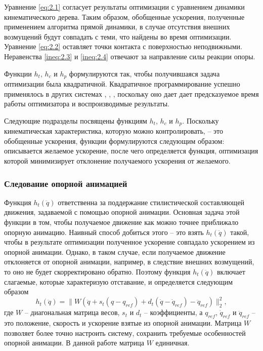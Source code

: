 Уравнение \ref{eq:2.1} согласует результаты оптимизации с уравнением динамики кинематического дерева. Таким образом, обобщенные ускорения, полученные применением алгоритма прямой динамики, в случае отсутствия внешних возмущений будут совпадать с теми, что найдены во время оптимизации. Уравнение \ref{eq:2.2} оставляет точки контакта с поверхностью неподвижными. Неравенства \ref{ineq:2.3} и \ref{ineq:2.4} отвечают за направление силы реакции опоры.

Функции $h_{t}$, $h_{c}$ и $h_{p}$ формулируются так, чтобы получившаяся задача оптимизации была квадратичной. Квадратичное программирование успешно применялось в других системах \cite{AbeSP}, \cite{MacchiettoZS}, \cite{SilvaAP}, поскольку оно дает дает предсказуемое время работы оптимизатора и воспроизводимые результаты.

Следующие подразделы посвящены функциям $h_{t}$, $h_{c}$ и $h_{p}$. Поскольку кинематическая характеристика, которую можно контролировать, -- это обобщенные ускорения, функции формулируются следующим образом: описывается желаемое ускорение, после чего определяется функция, оптимизация которой минимизирует отклонение получаемого ускорения от желаемого.

\subsubsection{Следование опорной анимацией}

Функция $h_{t}(\ddot{q})$ ответственна за поддержание стилистической составляющей движения, задаваемой с помощью опорной анимации. Основная задача этой функции в том, чтобы получаемое движение как можно точнее приближало опорную анимацию. Наивный способ добиться этого -- это взять $h_{t}(\ddot{q})$ такой, чтобы в результате оптимизации полученное ускорение совпадало ускорением из опорной анимации. Однако, в таком случае, если получаемое движение отклоняется от опорной анимации, например, в следствие внешних возмущений, то оно не будет скорректировано обратно. Поэтому функция $h_{t}(\ddot{q})$ включает слагаемые, которые характеризую отставание, и определяется следующим образом
\begin{equation*}
  h_{t}(\ddot{q}) = \lVert W (\ddot{q} + s_{t} (q - q_{ref}) + d_{t} (\dot{q} - \dot{q}_{ref}) - \ddot{q}_{ref}) \rVert_{2}^{2},
\end{equation*}
где $W$ -- диагональная матрица весов, $s_{t}$ и $d_{t}$ -- коэффициенты, а $q_{ref}$, $\dot{q}_{ref}$ и $\ddot{q}_{ref}$ -- это положение, скорость и ускорение взятые из опорной анимации. Матрица $W$ позволяет более точно настроить систему, сохранить требуемые особенностей опорной анимации. В данной работе матрица $W$ единичная.

